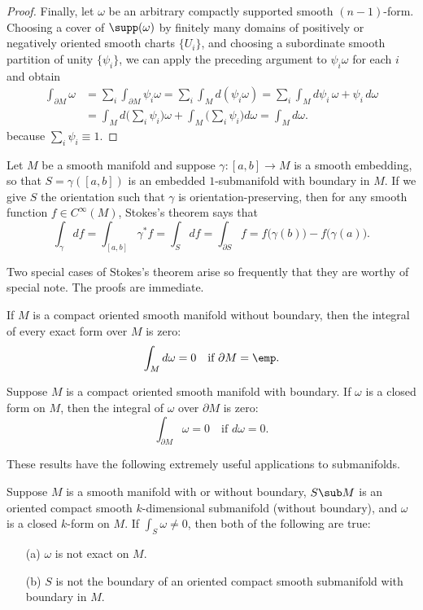 \begin{proof}
Finally, let $\omega$ be an arbitrary compactly supported smooth $(n-1)$-form. Choosing a cover of $\supp(\omega)$ by finitely many domains of positively or negatively oriented smooth charts $\{U_i\}$, and choosing a subordinate smooth partition of unity $\{\psi_i\}$, we can apply the preceding argument to $\psi_i\omega$ for each $i$ and obtain
\begin{align*}
\int_{\partial M}\omega&=\sum_i\int_{\partial M}\psi_i\omega=\sum_i\int_Md(\psi_i\omega)=\sum_i\int_Md\psi_i\,\omega+\psi_i\,d\omega\\
&=\int_Md\Big(\sum_i\psi_i\Big)\omega+\int_M\Big(\sum_i\psi_i\Big)d\omega=\int_Md\omega.
\end{align*}
because $\sum_i\psi_i\equiv 1$.
\end{proof}
\begin{example}
Let $M$ be a smooth manifold and suppose $\gamma:[a,b]\to M$ is a smooth embedding, so that $S=\gamma([a,b])$ is an embedded $1$-submanifold with boundary in $M$. If we give $S$ the orientation such that $\gamma$ is orientation-preserving, then for any smooth function $f\in C^\infty(M)$, Stokes's theorem says that
\[\int_{\gamma}df=\int_{[a,b]}\gamma^*f=\int_{S}df=\int_{\partial S}f=f\big(\gamma(b)\big)-f\big(\gamma(a)\big).\]
\end{example}
Two special cases of Stokes's theorem arise so frequently that they are worthy of special note. The proofs are immediate.
\begin{corollary}\label{int exact form}
If $M$ is a compact oriented smooth manifold without boundary, then the integral of every exact form over $M$ is zero:
\[\int_Md\omega=0\quad\text{if }\partial M=\emp.\]
\end{corollary}
\begin{corollary}\label{int closed form}
Suppose $M$ is a compact oriented smooth manifold with boundary. If $\omega$ is a closed form on $M$, then the integral of $\omega$ over $\partial M$ is zero:
\[\int_{\partial M}\omega=0\quad\text{if }d\omega=0.\]
\end{corollary}
These results have the following extremely useful applications to submanifolds.
\begin{corollary}
Suppose $M$ is a smooth manifold with or without boundary, $S\sub M$ is an oriented compact smooth $k$-dimensional submanifold (without boundary), and $\omega$ is a closed $k$-form on $M$. If $\int_S\omega\neq0$, then both of the following are
true:
\begin{itemize}
\item[(a)] $\omega$ is not exact on $M$.
\item[(b)] $S$ is not the boundary of an oriented compact smooth submanifold with boundary in $M$.
\end{itemize}
\end{corollary}
